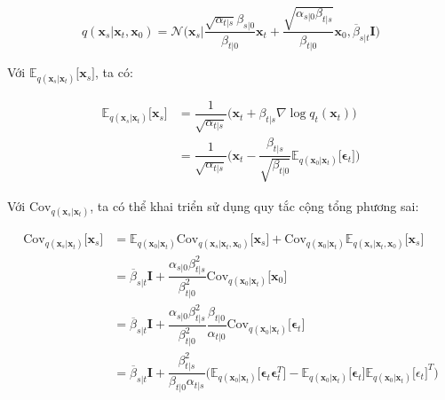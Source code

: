 \documentclass[14pt, a4paper]{article}
\numberwithin{equation}{section}
\numberwithin{figure}{section}
\numberwithin{dl}{section}
\numberwithin{md}{section}
\numberwithin{bd}{section}
\numberwithin{dn}{section}
\numberwithin{hq}{section}
\begin{document}
    \begin{equation}
        q(\boldsymbol{x}_s \vert \boldsymbol{x}_t, \boldsymbol{x}_0) = \mathcal{N} \big( \boldsymbol{x}_s \vert \dfrac{\sqrt{\alpha_{t \vert s}} \beta_{s \vert 0}}{\beta_{t \vert 0}} \boldsymbol{x}_t + \dfrac{\sqrt{\alpha_{s \vert 0} \beta_{t \vert s}}}{\beta_{t \vert 0}} \boldsymbol{x}_0, \overline{\beta}_{s \vert t} \boldsymbol{I} \big)
    \end{equation}

    Với $\mathbb{E}_{q(\boldsymbol{x}_s \vert \boldsymbol{x}_t)} \lbrack \boldsymbol{x}_s \rbrack$, ta có:

    \begin{equation}
        \begin{aligned}
            \mathbb{E}_{q(\boldsymbol{x}_s \vert \boldsymbol{x}_t)} \lbrack \boldsymbol{x}_s \rbrack &= \dfrac{1}{\sqrt{\alpha_{t \vert s}}} \big( \boldsymbol{x}_t + \beta_{t \vert s} \nabla \log q_t(\boldsymbol{x}_t) \big) \\
            &= \dfrac{1}{\sqrt{\alpha_{t \vert s}}} \big( \boldsymbol{x}_t - \dfrac{\beta_{t \vert s}}{\sqrt{\beta_{t \vert 0}}} \mathbb{E}_{q(\boldsymbol{x}_0 \vert \boldsymbol{x}_t)} \lbrack \boldsymbol{\epsilon}_t \rbrack \big)
        \end{aligned}    
    \end{equation}

    Với $\mathrm{Cov}_{q(\boldsymbol{x}_s \vert \boldsymbol{x}_t)}$, ta có thể khai triển sử dụng quy tắc cộng tổng phương sai:

    \begin{equation}
        \begin{aligned}
            \mathrm{Cov}_{q(\boldsymbol{x}_s \vert \boldsymbol{x}_t)} \lbrack \boldsymbol{x}_s \rbrack &= \mathbb{E}_{q(\boldsymbol{x}_0 \vert \boldsymbol{x}_t)} \mathrm{Cov}_{q(\boldsymbol{x}_s \vert \boldsymbol{x}_t, \boldsymbol{x}_0)} \lbrack \boldsymbol{x}_s \rbrack + \mathrm{Cov}_{q(\boldsymbol{x}_0 \vert \boldsymbol{x}_t)} \mathbb{E}_{q(\boldsymbol{x}_s \vert \boldsymbol{x}_t, \boldsymbol{x}_0)} \lbrack \boldsymbol{x}_s \rbrack \\
            &= \overline{\beta}_{s \vert t} \boldsymbol{I} + \dfrac{\alpha_{s \vert 0} \beta_{t \vert s}^2}{\beta_{t \vert 0}^2} \mathrm{Cov}_{q(\boldsymbol{x}_0 \vert \boldsymbol{x}_t)} \lbrack \boldsymbol{x}_0 \rbrack \\
            &= \overline{\beta}_{s \vert t} \boldsymbol{I} + \dfrac{\alpha_{s \vert 0} \beta_{t \vert s}^2}{\beta_{t \vert 0}^2} \dfrac{\beta_{t \vert 0}}{\alpha_{t \vert 0}} \mathrm{Cov}_{q(\boldsymbol{x}_0 \vert \boldsymbol{x}_t)} \lbrack \boldsymbol{\epsilon}_t \rbrack \\
            &= \overline{\beta}_{s \vert t} \boldsymbol{I} + \dfrac{\beta_{t \vert s}^2}{\beta_{t \vert 0} \alpha_{t \vert s}} \big( \mathbb{E}_{q(\boldsymbol{x}_0 \vert \boldsymbol{x}_t)} \lbrack \boldsymbol{\epsilon}_t \boldsymbol{\epsilon}_t^T \rbrack - \mathbb{E}_{q(\boldsymbol{x}_0 \vert \boldsymbol{x}_t)} \lbrack \boldsymbol{\epsilon}_t \rbrack \mathbb{E}_{q(\boldsymbol{x}_0 \vert \boldsymbol{x}_t)} \lbrack \epsilon_t \rbrack^T \big)
        \end{aligned}
    \end{equation}
\end{document}
